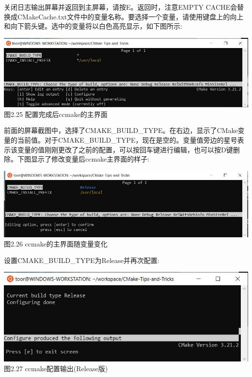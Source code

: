关闭日志输出屏幕并返回到主屏幕，请按E。返回时，注意EMPTY CACHE会替换成CMakeCache.txt文件中的变量名称。要选择一个变量，请使用键盘上的向上和向下箭头键。选中的变量将以白色高亮显示，如下图所示:

\begin{center}
\includegraphics[width=1.\textwidth]{content/1/chapter2/images/25.jpg}\\
图2.25 配置完成后ccmake的主界面
\end{center}

前面的屏幕截图中，选择了CMAKE\_BUILD\_TYPE。在右边，显示了CMake变量的当前值。对于CMAKE\_BUILD\_TYPE，现在是空的。变量值旁边的星号表示该变量的值刚刚更改了之前的配置，可以按回车键进行编辑，也可以按D键删除。下图显示了修改变量后ccmake主界面的样子:

\begin{center}
\includegraphics[width=1.\textwidth]{content/1/chapter2/images/26.jpg}\\
图2.26 ccmake的主界面随变量变化
\end{center}

设置CMAKE\_BUILD\_TYPE为Release并再次配置:

\begin{center}
\includegraphics[width=1.\textwidth]{content/1/chapter2/images/27.jpg}\\
图2.27 ccmake配置输出(Release版)
\end{center}

